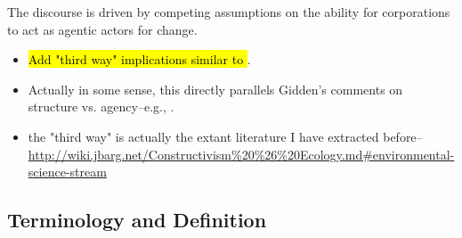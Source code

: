 \documentclass{article}
\begin{document}
	The discourse is driven by competing assumptions on the ability for corporations to act as agentic actors for change. 
	\begin{itemize}
		\item \hl{Add "third way" implications similar to \citet{Giddens1979}}.	
		\item Actually in some sense, this directly parallels Gidden's comments on structure vs. agency--e.g., \citet{Heikkurinen2019}.
		\item the "third way" is actually the extant literature I have extracted before--\url{http://wiki.jbarg.net/Constructivism%20%26%20Ecology.md#environmental-science-stream}
	\end{itemize}

	\subsection*{Terminology and Definition}
\end{document}
